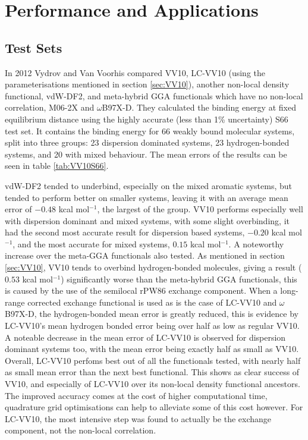 \documentclass[10pt,a4paper,twocolumn,twoside]{extarticle}
\newcommand{\kcal}{kcal mol\(^{-1}\)}
\begin{document}
	\section{Performance and Applications}
	\subsection{Test Sets}
	In 2012 Vydrov and Van Voorhis compared VV10, LC-VV10 (using the parameterisations mentioned in section \ref{sec:VV10}), another non-local density functional, vdW-DF2\cite{Lee2010-vdW-DF2-Original}, and meta-hybrid GGA functionals which have no non-local correlation, M06-2X\cite{M06-2X} and $\omega$B97X-D\cite{B97X-D}. They calculated the binding energy at fixed equilibrium distance using the highly accurate (less than 1\% uncertainty) S66\cite{s66a, s66b} test set. It contains the binding energy for 66 weakly bound molecular systems, split into three groups: 23 dispersion dominated systems, 23 hydrogen-bonded systems, and 20 with mixed behaviour. The mean errors of the results can be seen in table \ref{tab:VV10S66}.

	vdW-DF2 tended to underbind, especially on the mixed aromatic systems, but tended to perform better on smaller systems, leaving it with an average mean error of $-0.48$ \kcal, the largest of the group. VV10 performs especially well with dispersion dominant and mixed systems, with some slight overbinding, it had the second most accurate result for dispersion based systems, $-0.20$ \kcal, and the most accurate for mixed systems, $0.15$ \kcal. A noteworthy increase over the meta-GGA functionals also tested. As mentioned in section \ref{sec:VV10}, VV10 tends to overbind hydrogen-bonded molecules, giving a result ($0.53$ \kcal) significantly worse than the meta-hybrid GGA functionals, this is caused by the use of the semilocal rPW86 exchange component. When a long-range corrected exchange functional is used as is the case of LC-VV10 and $\omega$B97X-D, the hydrogen-bonded mean error is greatly reduced, this is evidence by LC-VV10's mean hydrogen bonded error being over half as low as regular VV10. 
	A noteable decrease in the mean error of LC-VV10 is observed for dispersion dominant systems too, with the mean error being exactly half as small as VV10. Overall, LC-VV10 perfoms best out of all the functionals tested, with nearly half as small mean error than the next best functional. This shows as clear success of VV10, and especially of LC-VV10 over its non-local density functional ancestors. The improved accuracy comes at the cost of higher computational time\cite{vydrov2008-vdw-comparisons}, quadrature grid optimisations can help to alleviate some of this cost however. For LC-VV10, the most intensive step was found to actually be the exchange component, not the non-local correlation.
\end{document}
